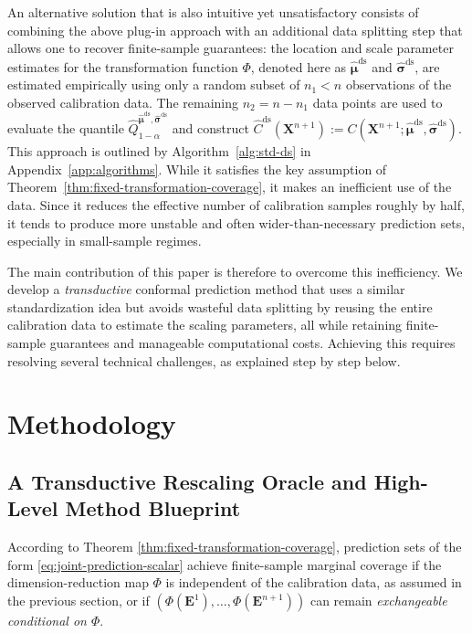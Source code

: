 An alternative solution that is also intuitive yet unsatisfactory consists of combining the above plug-in approach with an additional data splitting step that allows one to recover finite-sample guarantees: the location and scale parameter estimates for the transformation function $\Phi$, denoted here as $\boldsymbol{\hat{\mu}^{\mathrm{ds}}}$ and $\boldsymbol{\hat{\sigma}^{\mathrm{ds}}}$, are estimated empirically using only a random subset of $n_1 < n$ observations of the observed calibration data. The remaining $n_2 = n-n_1$ data points are used to evaluate the quantile $\hat{Q}^{\hat{\boldsymbol\mu}^{\mathrm{ds}}, \hat{\boldsymbol\sigma}^{\mathrm{ds}}}_{1-\alpha}$ and construct $\hat{C}^{\mathrm{ds}}(\mathbf{X}^{n+1}):= C(\mathbf{X}^{n+1};\hat{\boldsymbol\mu}^{\mathrm{ds}}, \hat{\boldsymbol\sigma}^{\mathrm{ds}})$.
This approach is outlined by Algorithm~\ref{alg:std-ds} in Appendix~\ref{app:algorithms}.
While it satisfies the key assumption of Theorem~\ref{thm:fixed-transformation-coverage}, it makes an inefficient use of the data. Since it reduces the effective number of calibration samples roughly by half, it tends to produce more unstable and often wider-than-necessary prediction sets, especially in small-sample regimes.

The main contribution of this paper is therefore to overcome this inefficiency. We develop a \emph{transductive} conformal prediction method that uses a similar standardization idea but avoids wasteful data splitting by reusing the entire calibration data to estimate the scaling parameters, all while retaining finite-sample guarantees and manageable computational costs.
Achieving this requires resolving several technical challenges, as explained step by step below.


\section{Methodology} \label{sec:methods}

\subsection{A Transductive Rescaling Oracle and High-Level Method Blueprint}\label{sec:method-oracle}

According to Theorem \ref{thm:fixed-transformation-coverage}, prediction sets of the form \eqref{eq:joint-prediction-scalar} achieve finite-sample marginal coverage if the dimension-reduction map $\Phi$ is independent of the calibration data, as assumed in the previous section, or if $(\Phi(\mathbf{E}^1),\ldots,\Phi(\mathbf{E}^{n+1}))$ can remain \emph{exchangeable conditional on $\Phi$}.

